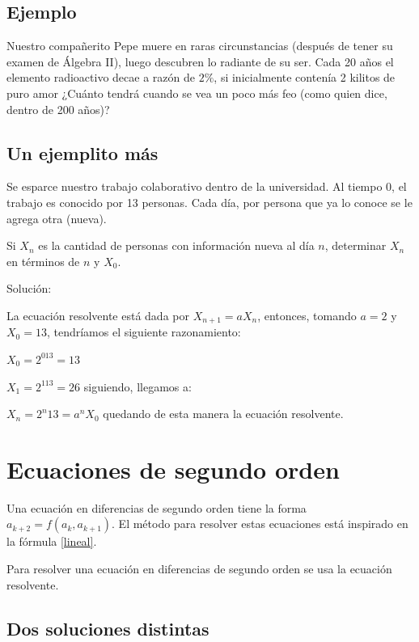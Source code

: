 \documentclass{article}
\begin{document}
\subsection{Ejemplo}

Nuestro compañerito Pepe muere en raras circunstancias (después de
tener su examen de Álgebra II), luego descubren lo radiante de su
ser. Cada 20 años el elemento radioactivo decae a razón de $2\%$, si
inicialmente contenía 2 kilitos de puro amor ¿Cuánto tendrá cuando se
vea un poco más feo (como quien dice, dentro de 200 años)?


\subsection{Un ejemplito más}

Se esparce nuestro trabajo colaborativo dentro de la universidad. Al tiempo 0, el trabajo es conocido por 13 personas. Cada día, por persona que ya lo conoce se le agrega otra (nueva).

Si $X_n$ es la cantidad de personas con información nueva al día $n$, determinar $X_n$ en términos de $n$ y $X_0$.

Solución:

La ecuación resolvente está dada por $X_{n+1}=aX_n$, entonces, tomando $a=2$ y $X_0=13$, tendríamos el siguiente razonamiento:

$X_0=2^013=13$

$X_1=2^113=26$ siguiendo, llegamos a:

$X_n=2^n13=a^nX_0$ quedando de esta manera la ecuación resolvente.

\section{Ecuaciones de segundo orden}

Una ecuación en diferencias de segundo orden tiene la forma $a_{k+2}=f(a_k,a_{k+1})$.
El método para resolver estas ecuaciones está inspirado en la fórmula \ref{lineal}.

Para resolver una ecuación en diferencias de segundo orden se usa la ecuación resolvente.



\subsection{Dos soluciones distintas}
\label{sec:distintas}
\end{document}
